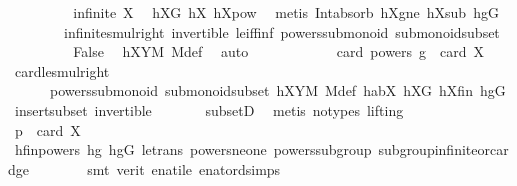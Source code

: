 \begin{isabellebody}
\ \ \ \ \ \ \isamarkupfalse%
\ \isamarkupfalse%
\ {\isachardoublequoteopen}infinite\ X{\isachardoublequoteclose}\ \isamarkupfalse%
\ hXG\ hX{}\ hXpow\ \isamarkupfalse%
\ {\isacharparenleft}{\kern0pt}metis\ Int{\isacharunderscore}{\kern0pt}absorb{}\ hXgne\ hXsub\ hgG\ \isanewline
\ \ \ \ \ \ \ \ infinite{\isacharunderscore}{\kern0pt}smul{\isacharunderscore}{\kern0pt}right\ invertible\ le{\isacharunderscore}{\kern0pt}iff{\isacharunderscore}{\kern0pt}inf\ powers{\isacharunderscore}{\kern0pt}submonoid\ submonoid{\isachardot}{\kern0pt}subset{\isacharparenright}{\kern0pt}\isanewline
\ \ \ \ \ \ \isamarkupfalse%
\ \isamarkupfalse%
\ False\ \isamarkupfalse%
\ hXYM\ M{\isacharunderscore}{\kern0pt}def\ \isamarkupfalse%
\ auto\isanewline
\ \ \ \ \isamarkupfalse%
\isanewline
\ \ \ \ \isamarkupfalse%
\ \isamarkupfalse%
\ {\isachardoublequoteopen}card\ {\isacharparenleft}{\kern0pt}powers\ g{\isacharparenright}{\kern0pt}\ {\isasymle}\ card\ X{\isachardoublequoteclose}\ \isamarkupfalse%
\ card{\isacharunderscore}{\kern0pt}le{\isacharunderscore}{\kern0pt}smul{\isacharunderscore}{\kern0pt}right\ \isanewline
\ \ \ \ \ \ powers{\isacharunderscore}{\kern0pt}submonoid\ submonoid{\isachardot}{\kern0pt}subset\ hXYM\ M{\isacharunderscore}{\kern0pt}def\ habX\ hXG\ hXfin\ hgG\ insert{\isacharunderscore}{\kern0pt}subset\ invertible\ \isanewline
\ \ \ \ \ \ subsetD\ \isamarkupfalse%
\ {\isacharparenleft}{\kern0pt}metis\ {\isacharparenleft}{\kern0pt}no{\isacharunderscore}{\kern0pt}types{\isacharcomma}{\kern0pt}\ lifting{\isacharparenright}{\kern0pt}{\isacharparenright}{\kern0pt}\isanewline
\ \ \ \ \isamarkupfalse%
\ \isamarkupfalse%
\ {\isachardoublequoteopen}p\ {\isasymle}\ card\ X{\isachardoublequoteclose}\ \isanewline
\ \ \ \ \ \ \isamarkupfalse%
\ hfinpowers\ hg{}\ hgG\ le{\isacharunderscore}{\kern0pt}trans\ powers{\isacharunderscore}{\kern0pt}ne{\isacharunderscore}{\kern0pt}one\ powers{\isacharunderscore}{\kern0pt}subgroup\ subgroup{\isacharunderscore}{\kern0pt}infinite{\isacharunderscore}{\kern0pt}or{\isacharunderscore}{\kern0pt}card{\isacharunderscore}{\kern0pt}ge\isanewline
\ \ \ \ \ \ \isamarkupfalse%
\ {\isacharparenleft}{\kern0pt}smt\ {\isacharparenleft}{\kern0pt}verit{\isacharparenright}{\kern0pt}\ enat{\isacharunderscore}{\kern0pt}ile\ enat{\isacharunderscore}{\kern0pt}ord{\isacharunderscore}{\kern0pt}simps{\isacharparenleft}{\kern0pt}{}{\isacharparenright}{\kern0pt}{\isacharparenright}{\kern0pt}\isanewline

\end{isabellebody}
